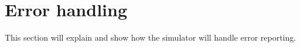\section{Error handling}
	This section will explain and show how the simulator will handle error reporting. 